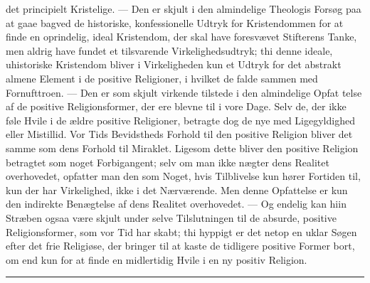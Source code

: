 \documentclass[12pt,a4paper,openany]{book}
\newcommand{\opage}[1]{\marginnote{\footnotesize\textit{[#1]}}}
\begin{document}
det principielt Kristelige. --- Den er skjult i den almindelige
Theologis Forsøg paa at gaae bagved de historiske, konfessionelle
Udtryk for Kristendommen for at finde en oprindelig,
ideal Kristendom, der skal have foresvævet Stifterens Tanke,
men aldrig have fundet et tilsvarende Virkelighedsudtryk; thi
denne ideale, uhistoriske Kristendom bliver i Virkeligheden
kun et Udtryk for det abstrakt almene Element i de positive
Religioner, i hvilket de falde sammen med Fornufttroen. ---
Den er som skjult virkende tilstede i den almindelige Opfat%
\opage{297}telse af de positive Religionsformer, der ere blevne til i
vore Dage. Selv de, der ikke føle Hvile i de ældre positive
Religioner, betragte dog de nye med Ligegyldighed eller
Mistillid. Vor Tids Bevidstheds Forhold til den positive
Religion bliver det samme som dens Forhold til Miraklet.
Ligesom dette bliver den positive Religion betragtet som noget
Forbigangent; selv om man ikke nægter dens Realitet overhovedet,
opfatter man den som Noget, hvis Tilblivelse kun
hører Fortiden til, kun der har Virkelighed, ikke i det Nærværende.
Men denne Opfattelse er kun den indirekte Benægtelse
af dens Realitet overhovedet. --- Og endelig kan hiin
Stræben ogsaa være skjult under selve Tilslutningen til de
absurde, positive Religionsformer, som vor Tid har skabt;
thi hyppigt er det netop en uklar Søgen efter det frie
Religiøse, der bringer til at kaste de tidligere positive
Former bort, om end kun for at finde en midlertidig Hvile
i en ny positiv Religion.

\begin{center}\rule{1.8cm}{0.4pt}\end{center}
\end{document}
